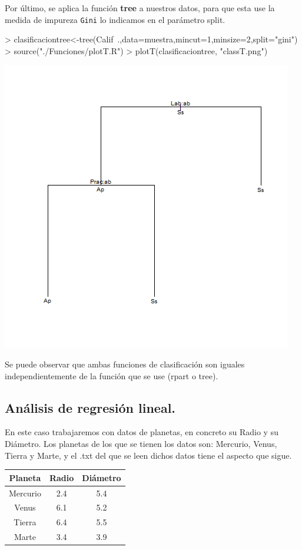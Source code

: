 \documentclass [a4paper] {article}
\begin{document}
\bigskip
Por último, se aplica la función \textbf{tree} a nuestros datos, para que esta use la medida de impureza \texttt{Gini} lo indicamos
en el parámetro split.
\begin{Schunk}
\begin{Sinput}
> clasificaciontree<-tree(Calif~.,data=muestra,mincut=1,minsize=2,split="gini")
> source("./Funciones/plotT.R")
> plotT(clasificaciontree, "classT.png")
\end{Sinput}
\end{Schunk}
\includegraphics[width=\textwidth]{classT}

\bigskip
Se puede observar que ambas funciones de clasificación son iguales independientemente de la función que se use (rpart o tree).


\subsection{Análisis de regresión lineal.}
En este caso trabajaremos con datos de planetas, en concreto su Radio y su Diámetro. Los planetas de los que se tienen
los datos son: Mercurio, Venus, Tierra y Marte, y el .txt del que se leen dichos datos tiene el aspecto que
sigue.
\begin{table}[H]
\begin{center}
\begin{tabular}{|c|c|c|}
\hline
Planeta & Radio & Diámetro\\
\hline \hline
Mercurio & 2.4 & 5.4 \\ \hline
Venus & 6.1 & 5.2 \\ \hline
Tierra & 6.4 & 5.5 \\ \hline
Marte & 3.4 & 3.9 \\ \hline
\end{tabular}
\end{center}
\end{table}
\end{document}
